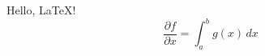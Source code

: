 \documentclass{article}
\begin{document}
Hello, \LaTeX!
\[
\frac{\partial f}{\partial x} = \int_{a}^{b} g(x) \, dx
\]
\end{document}
